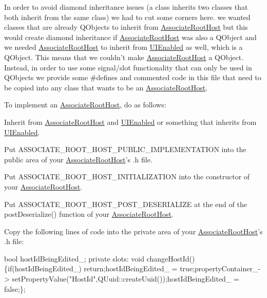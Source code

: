 In order to avoid diamond inheritance issues (a class inherits two classes that both inherit from the same class) we had to cut some corners here. we wanted classes that are already Q\-Objects to inherit from \hyperlink{class_picto_1_1_associate_root_host}{Associate\-Root\-Host} but this would create diamond inheritance if \hyperlink{class_picto_1_1_associate_root_host}{Associate\-Root\-Host} was also a Q\-Object and we needed \hyperlink{class_picto_1_1_associate_root_host}{Associate\-Root\-Host} to inherit from \hyperlink{class_picto_1_1_u_i_enabled}{U\-I\-Enabled} as well, which is a Q\-Object. This means that we couldn't make \hyperlink{class_picto_1_1_associate_root_host}{Associate\-Root\-Host} a Q\-Object. Instead, in order to use some signal/slot functionality that can only be used in Q\-Objects we provide some \#defines and commented code in this file that need to be copied into any class that wants to be an \hyperlink{class_picto_1_1_associate_root_host}{Associate\-Root\-Host}.

To implement an \hyperlink{class_picto_1_1_associate_root_host}{Associate\-Root\-Host}, do as follows\-:
\begin{DoxyItemize}
\item Inherit from \hyperlink{class_picto_1_1_associate_root_host}{Associate\-Root\-Host} and \hyperlink{class_picto_1_1_u_i_enabled}{U\-I\-Enabled} or something that inherits from \hyperlink{class_picto_1_1_u_i_enabled}{U\-I\-Enabled}.
\item Put A\-S\-S\-O\-C\-I\-A\-T\-E\-\_\-\-R\-O\-O\-T\-\_\-\-H\-O\-S\-T\-\_\-\-P\-U\-B\-L\-I\-C\-\_\-\-I\-M\-P\-L\-E\-M\-E\-N\-T\-A\-T\-I\-O\-N into the public area of your \hyperlink{class_picto_1_1_associate_root_host}{Associate\-Root\-Host}'s .h file.
\item Put A\-S\-S\-O\-C\-I\-A\-T\-E\-\_\-\-R\-O\-O\-T\-\_\-\-H\-O\-S\-T\-\_\-\-I\-N\-I\-T\-I\-A\-L\-I\-Z\-A\-T\-I\-O\-N into the constructor of your \hyperlink{class_picto_1_1_associate_root_host}{Associate\-Root\-Host}.
\item Put A\-S\-S\-O\-C\-I\-A\-T\-E\-\_\-\-R\-O\-O\-T\-\_\-\-H\-O\-S\-T\-\_\-\-P\-O\-S\-T\-\_\-\-D\-E\-S\-E\-R\-I\-A\-L\-I\-Z\-E at the end of the post\-Deserialize() function of your \hyperlink{class_picto_1_1_associate_root_host}{Associate\-Root\-Host}.
\item Copy the following lines of code into the private area of your \hyperlink{class_picto_1_1_associate_root_host}{Associate\-Root\-Host}'s .h file\-: 
\begin{DoxyCode}
\textcolor{keywordtype}{bool} hostIdBeingEdited\_;
\textcolor{keyword}{private} slots:
\textcolor{keywordtype}{void} changeHostId()\{\textcolor{keywordflow}{if}(hostIdBeingEdited\_) \textcolor{keywordflow}{return};hostIdBeingEdited\_ = \textcolor{keyword}{true};propertyContainer\_->
      setPropertyValue(\textcolor{stringliteral}{"HostId"},QUuid::createUuid());hostIdBeingEdited\_ = \textcolor{keyword}{false};\};
\end{DoxyCode}

\end{DoxyItemize}

